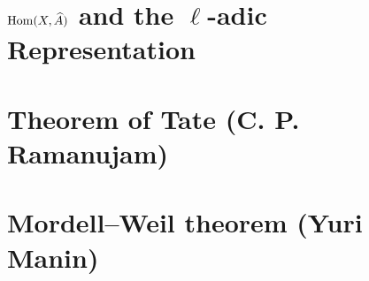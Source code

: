 \chapter[Hom(X, A-hat) and the l-adic Representation]
{$\operatorname{Hom}(X,\widehat{A})$ and the $\ell$-adic Representation}
\label{chap:mumford-hom-ladic}






\appendix

\chapter[Theorem of Tate (C. P. Ramanujam)]
{Theorem of Tate (C. P. Ramanujam)}
\label{chap:mumford-tate}




\chapter[Mordell--Weil theorem (Yuri Manin)]
{Mordell--Weil theorem (Yuri Manin)}
\label{chap:mumford-mordell-weil}


